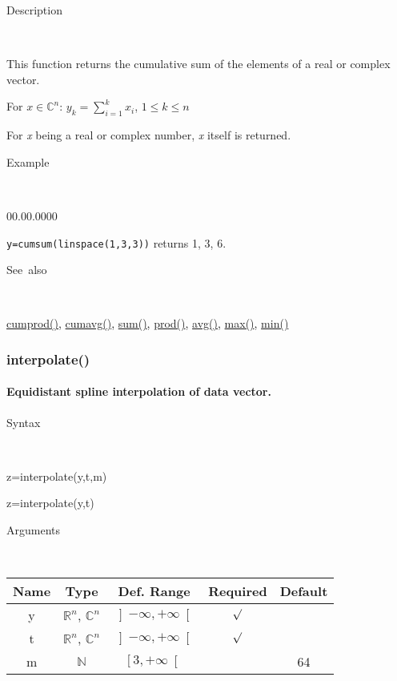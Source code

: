 \begin{description}
\item [Description]~
\end{description}
This function returns the cumulative sum of the elements of a real
or complex vector.

\medskip{}
For $x\in$$\mathbb{C}^{n}$: $y_{k}=$${\displaystyle \sum\limits _{i=1}^{k}x_{i}}$,
$1\leq k\leq n$
\medskip{}

For \textit{x} being a real or complex number, \textit{x} itself is
returned.

\begin{description}
\item [Example]~
\end{description}
\begin{lyxlist}{00.00.0000}
\item [\texttt{y=cumsum(linspace(1,3,3))}]returns 1, 3, 6.
\end{lyxlist}
\begin{description}
\item [See~also]~
\end{description}
\textcolor{blue}{\hyperlink{cumprod}{cumprod()}}\textcolor{black}{,}
\textcolor{blue}{\hyperlink{cumavg}{cumavg()}}\textcolor{black}{,}
\textcolor{blue}{\hyperlink{sum}{sum()}}\textcolor{black}{,} \textcolor{blue}{\hyperlink{prod}{prod()}}\textcolor{black}{,}
\textcolor{blue}{\hyperlink{avg}{avg()}}\textcolor{black}{,} \textcolor{blue}{\hyperlink{max}{max()}}\textcolor{black}{,}
\textcolor{blue}{\hyperlink{min}{min()}}


\newpage
\subsubsection*{\hypertarget{interpolate}{}{\Large interpolate()}}


\paragraph{\label{par:spline-interpolation}Equidistant spline interpolation
of data vector.}

\begin{description}
\item [Syntax]~
\end{description}
z=interpolate(y,t,m)

z=interpolate(y,t)

\begin{description}
\item [Arguments]~
\end{description}
\begin{tabular}{|c|c|c|c|c|}
\hline 
Name&
Type&
Def. Range&
Required&
Default\tabularnewline
\hline
\hline 
y&
$\mathbb{R}^{n}$, $\mathbb{C}^{n}$&
$\left]-\infty,+\infty\right[$&
$\surd$&
\tabularnewline
\hline
t&
$\mathbb{R}^{n}$, $\mathbb{C}^{n}$&
$\left]-\infty,+\infty\right[$&
$\surd$&
\tabularnewline
\hline
m&
$\mathbb{N}$&
$\left[3,+\infty\right[$&
&
64\tabularnewline
\hline
\end{tabular}


